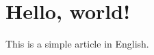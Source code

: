 \documentclass[a4paper,12pt]{article}
\begin{document}
\section*{Hello, world!}

This is a simple article in English.
\end{document}
